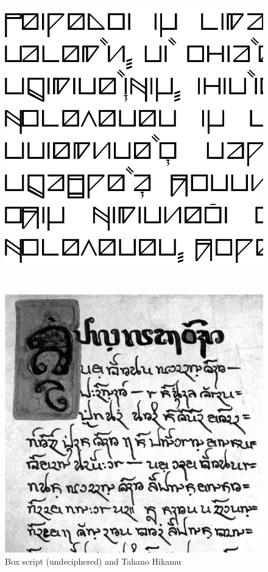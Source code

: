 \begin{figure}[tp]\centering
\begin{minipage}{.475\linewidth}\centering
\includegraphics[width=\linewidth]{images/hinya-300dpi-clip.png}
\label{fig:boxy}
\end{minipage}
~
\begin{minipage}{.475\linewidth}\centering
\includegraphics[width=\linewidth]{images/tahano-300dpi-bw-clip.png}
\end{minipage}
\caption{Box script (undeciphered) and Tahano Hikamu}
\label{fig:boxyhikamu}
\end{figure}

